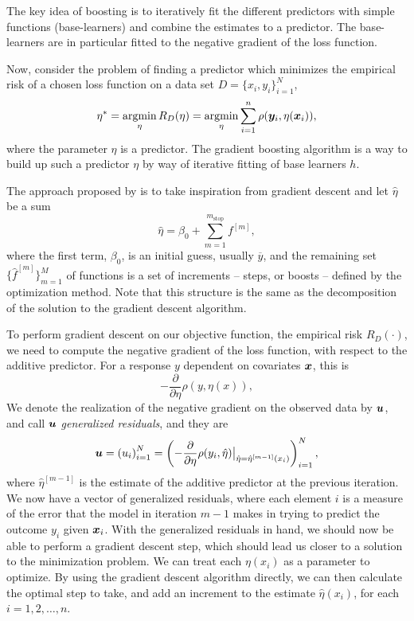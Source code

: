The key idea of boosting is to iteratively fit the different predictors with simple functions (base-learners) and combine the estimates to a predictor.
The base-learners are in particular fitted to the negative gradient of the loss function.

Now, consider the problem of finding a predictor which minimizes the empirical risk of a chosen loss function on a data set
$D=\{x_i,y_i\}_{i=1}^N$,
\begin{equation}\label{eq:argmin-eta}
    \eta^*=\operatorname*{argmin}_{\eta}R_D(\eta)=\operatorname*{argmin}_{\eta}\sum_{i=1}^n\rho(\bm{y}_i,\eta(\bm{x}_i)),
\end{equation}
where the parameter $\eta$ is a predictor.
The gradient boosting algorithm is a way to build up such a predictor $\eta$ by way of iterative fitting of base learners $h$.

The approach proposed by \citet{friedman2001} is to take inspiration from gradient descent and let $\hat{\eta}$ be a sum
\begin{equation*}
    \hat{\eta}=\beta_0+\sum_{m=1}^{m_{\text{stop}}}f^{[m]},
\end{equation*}
where the first term, $\beta_0$, is an initial guess, usually $\overline{y}$, and the remaining set $\{\hat{f}^{[m]}\}_{m=1}^M$ of 
functions is a set of increments -- steps, or boosts -- defined by the optimization method. Note that this structure
is the same as the decomposition of the solution to the gradient descent algorithm.

To perform gradient descent on our objective function, the empirical risk $R_D(\cdot)$,
we need to compute the negative gradient of the loss function, with respect to the additive predictor. For a response $y$ dependent on
covariates $\bm{x}$, this is
\begin{equation*}
    -\frac{\partial}{\partial\eta} \rho(y,\eta(x)),
\end{equation*}
We denote the realization of the negative gradient on the observed data by $\bm{u}$, and call $\bm{u}$ \textit{generalized residuals}, and they are
\begin{equation*}
    \bm{u}=\left(u_i\right)_{i=1}^N=\left(-\frac{\partial}{\partial \eta}\rho(y_i, \hat{\eta})\big\rvert_{\hat{\eta}=\hat{\eta}^{[m-1]}(x_i)}\right)_{i=1}^N,
\end{equation*}
where $\hat{\eta}^{[m-1]}$ is the estimate of the additive predictor at the previous iteration.
We now have a vector of generalized residuals, where each element $i$ is a measure of the error that the model in iteration $m-1$ makes
in trying to predict the outcome $y_i$ given $\bm{x}_i$.
With the generalized residuals in hand, we should now be able to perform a gradient descent step, which should lead us closer to a solution
to the minimization problem. We can treat each $\eta(x_i)$ as a parameter to optimize. By using the gradient descent algorithm directly, we
can then calculate the optimal step to take, and add an increment to the estimate $\hat{\eta}(x_i)$, for each $i=1,2,\ldots,n$.

